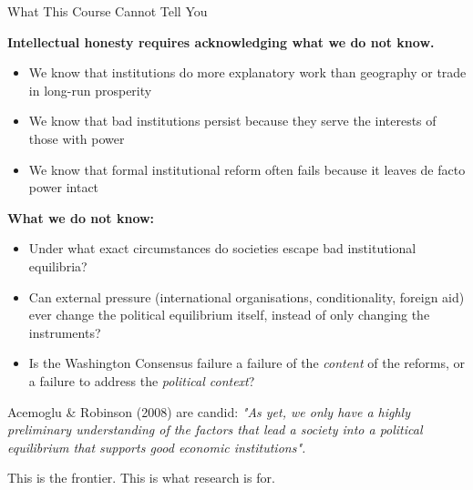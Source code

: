 \documentclass[10pt]{beamer}
\begin{document}
\begin{frame}[allowframebreaks]{What This Course Cannot Tell You}

\textbf{Intellectual honesty requires acknowledging what we do not know.}


\begin{itemize}
\item We know that institutions do more explanatory work than geography or trade in long-run prosperity
\item We know that bad institutions persist because they serve the interests of those with power
\item We know that formal institutional reform often fails because it leaves de facto power intact
\end{itemize}


\textbf{What we do not know:}
\begin{itemize}
\item Under what exact circumstances do societies escape bad institutional equilibria?
\item Can external pressure (international organisations, conditionality, foreign aid) ever change the political equilibrium itself, instead of only changing the instruments?
\item Is the Washington Consensus failure a failure of the \emph{content} of the reforms, or a failure to address the \emph{political context}?
\end{itemize}


Acemoglu \& Robinson (2008) are candid: \emph{"As yet, we only have a highly preliminary understanding of the factors that lead a society into a political equilibrium that supports good economic institutions".}


\alert{This is the frontier. This is what research is for.}
\end{frame}
\end{document}
